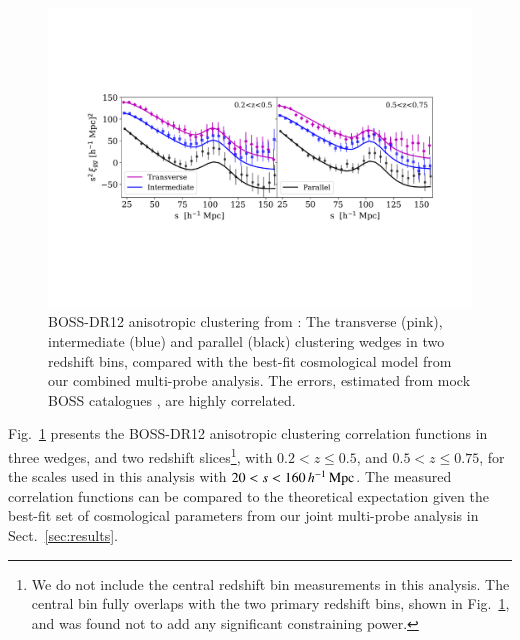 \begin{figure}
        \includegraphics[width=\textwidth]{Data_Plots/clustering_wedges/BOSS_Sanchez_wedges.pdf}
        \caption{BOSS-DR12 anisotropic clustering from \citet{sanchez/etal:2017}:
          The transverse (pink), intermediate (blue) and parallel
          (black) clustering wedges in two redshift bins, compared 
          with the best-fit
          cosmological model from our combined multi-probe analysis.  The errors, estimated from mock BOSS catalogues \citep{kitaura/etal:2016}, are highly correlated.}
        \label{fig:wedges}
\end{figure}

Fig.~\ref{fig:wedges} presents the \citet{sanchez/etal:2017} BOSS-DR12 anisotropic clustering correlation functions in three wedges, and two redshift slices\footnote{We do not include the \citet{sanchez/etal:2017} central redshift bin measurements in this analysis.  The central bin fully overlaps with the two primary redshift bins, shown in Fig.~\ref{fig:wedges}, and was found not to add any significant constraining power.}, with $0.2<z\leq0.5$, and $0.5<z\leq0.75$, for the scales used in this analysis with $20  < s < 160\, h^{-1}\, {\rm Mpc}$.   The measured correlation functions can be compared to the theoretical expectation given the best-fit set of cosmological parameters from our joint multi-probe analysis in Sect.~\ref{sec:results}.

